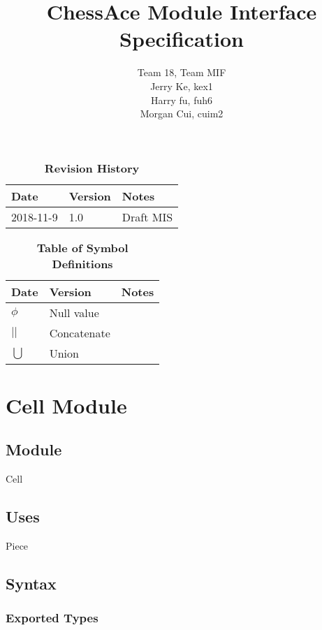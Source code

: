 \documentclass[12pt]{article}
\title{ChessAce Module Interface Specification}
\author{Team 18, Team MIF
		\\ Jerry Ke, kex1
		\\ Harry fu, fuh6
		\\ Morgan Cui, cuim2
}
\begin{document}
\maketitle

\newpage

\begin{table}[H]
\begin{tabularx}{\textwidth}{p{3cm}p{2cm}X}
\toprule {\bf Date} & {\bf Version} & {\bf Notes}\\
\midrule
2018-11-9 & 1.0 & Draft MIS\\
\bottomrule
\end{tabularx}
\caption{\bf Revision History}
\end{table}

\begin{table}[H]

	\begin{tabularx}{\textwidth}{p{3cm}p{2cm}X}
\toprule {\bf Date} & {\bf Version} & {\bf Notes}\\
\midrule
$\phi$ &Null value\\
\hline
$||$ &Concatenate\\
\hline
$\bigcup$ &Union\\
\bottomrule
\end{tabularx}
		\caption{\bf Table of Symbol Definitions}
		\label{table2}
\end{table}	

\newpage

\section* {Cell Module}

\subsection*{Module}

Cell

\subsection* {Uses}

Piece

\subsection* {Syntax}

\subsubsection* {Exported Types}
\end{document}
